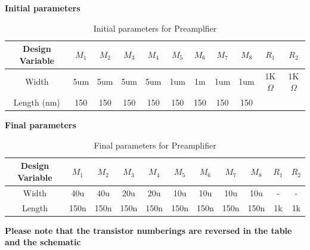 \documentclass[a4paper,12pt]{article}
\begin{document}
\textbf{Initial parameters}

\begin{table}[H]
    \centering
    \begin{tabular}{|c|c|c|c|c|c|c|c|c|c|c|}
        \hline
         Design Variable & $M_1$ & $M_2$ & $M_3$ & $M_4$ & $M_5$ & $M_6$ & $M_7$ & $M_8$ & $R_1$ & $R_2$  \\
         \hline
         Width & 5um & 5um & 5um & 5um & 1um & 1m & 1um & 1um & 1K$\Omega$ & 1K$\Omega$ \\  
         \hline
         Length (nm) & 150 & 150 & 150 & 150 & 150 & 150 & 150 & 150 & & \\ 
         \hline
    \end{tabular}
    \caption{Initial parameters for Preamplfier}
    \label{tab:my_label}
\end{table}

    \textbf{Final parameters}
    \begin{table}[H]
        \centering
        \begin{tabular}{|c|c|c|c|c|c|c|c|c|c|c|}
        \hline
         Design Variable & $M_1$ & $M_2$ & $M_3$ & $M_4$ & $M_5$ & $M_6$ & $M_7$ & $M_8$ & $R_1$ & $R_2$  \\
         \hline
         Width & 40u & 40u & 20u & 20u & 10u & 10u & 10u & 10u & - & -\\
         \hline
         Length & 150n & 150n & 150n & 150n & 150n & 150n & 150n  & 150n & 1k & 1k\\
         \hline
        \end{tabular}
        \caption{Final parameters for Preamplifier}
        \label{tab:my_label}
    \end{table}
    \textbf{Please note that the transistor numberings are reversed in the table and the schematic}
\end{document}
